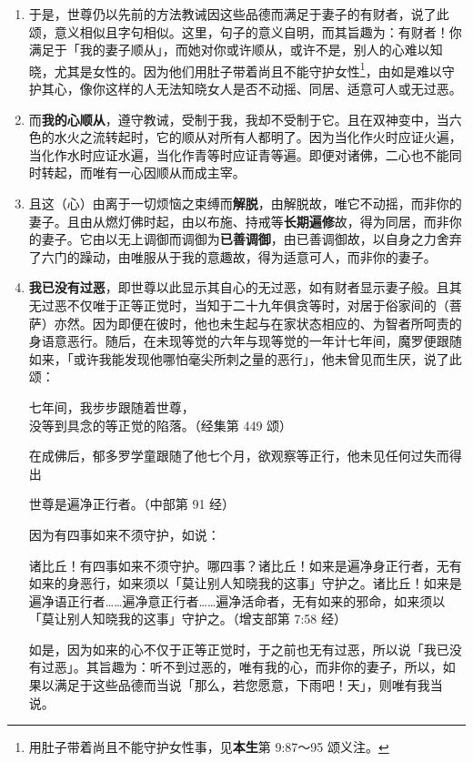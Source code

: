 \begin{enumerate}\item 于是，世尊仍以先前的方法教诫因这些品德而满足于妻子的有财者，说了此颂，意义相似且字句相似。这里，句子的意义自明，而其旨趣为：有财者！你满足于「我的妻子顺从」，而她对你或许顺从，或许不是，别人的心难以知晓，尤其是女性的。因为他们用肚子带着尚且不能守护女性\footnote{用肚子带着尚且不能守护女性事，见\textbf{本生}第 9:87～95 颂义注。}，由如是难以守护其心，像你这样的人无法知晓女人是否不动摇、同居、适意可人或无过恶。
\item 而\textbf{我的心顺从}，遵守教诫，受制于我，我却不受制于它。且在双神变中，当六色的水火之流转起时，它的顺从对所有人都明了。因为当化作火时应证火遍，当化作水时应证水遍，当化作青等时应证青等遍。即便对诸佛，二心也不能同时转起，而唯有一心因顺从而成主宰。
\item 且这（心）由离于一切烦恼之束缚而\textbf{解脱}，由解脱故，唯它不动摇，而非你的妻子。且由从燃灯佛时起，由以布施、持戒等\textbf{长期遍修}故，得为同居，而非你的妻子。它由以无上调御而调御为\textbf{已善调御}，由已善调御故，以自身之力舍弃了六门的躁动，由唯服从于我的意趣故，得为适意可人，而非你的妻子。
\item \textbf{我已没有过恶}，即世尊以此显示其自心的无过恶，如有财者显示妻子般。且其无过恶不仅唯于正等正觉时，当知于二十九年俱贪等时，对居于俗家间的（菩萨）亦然。因为即便在彼时，他也未生起与在家状态相应的、为智者所呵责的身语意恶行。随后，在未现等觉的六年与现等觉的一年计七年间，魔罗便跟随如来，「或许我能发现他哪怕毫尖所刺之量的恶行」，他未曾见而生厌，说了此颂：\begin{quoting}七年间，我步步跟随着世尊，\\没等到具念的等正觉的陷落。（经集第 449 颂）\end{quoting}在成佛后，郁多罗学童跟随了他七个月，欲观察等正行，他未见任何过失而得出\begin{quoting}世尊是遍净正行者。（中部第 91 经）\end{quoting}因为有四事如来不须守护，如说：\begin{quoting}诸比丘！有四事如来不须守护。哪四事？诸比丘！如来是遍净身正行者，无有如来的身恶行，如来须以「莫让别人知晓我的这事」守护之。诸比丘！如来是遍净语正行者……遍净意正行者……遍净活命者，无有如来的邪命，如来须以「莫让别人知晓我的这事」守护之。（增支部第 7:58 经）\end{quoting}如是，因为如来的心不仅于正等正觉时，于之前也无有过恶，所以说「我已没有过恶」。其旨趣为：听不到过恶的，唯有我的心，而非你的妻子，所以，如果以满足于这些品德而当说「那么，若您愿意，下雨吧！天」，则唯有我当说。\end{enumerate}

